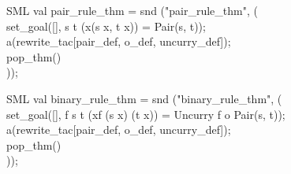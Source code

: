\documentclass[11pt,a4paper]{article}
\begin{document}
\begin{GFT}{SML}
\+val \PrNL{}pair\_rule\_thm\PrNN{} = snd ("pair\_rule\_thm", (\\
\+set\_goal([], \PrKM{} \PrLF{}s t\PrLH{} (\PrMM{}x\PrLH{}(s x, t x)) = Pair(s, t)\PrKO{});\\
\+a(rewrite\_tac[pair\_def, o\_def, uncurry\_def]);\\
\+pop\_thm()\\
\+));\\
\end{GFT}

\begin{GFT}{SML}
\+val \PrNL{}binary\_rule\_thm\PrNN{} = snd ("binary\_rule\_thm", (\\
\+set\_goal([], \PrKM{} \PrLF{}f s t\PrLH{} (\PrMM{}x\PrLH{}f (s x) (t x)) = Uncurry f o Pair(s, t)\PrKO{});\\
\+a(rewrite\_tac[pair\_def, o\_def, uncurry\_def]);\\
\+pop\_thm()\\
\+));\\
\end{GFT}
\end{document}
